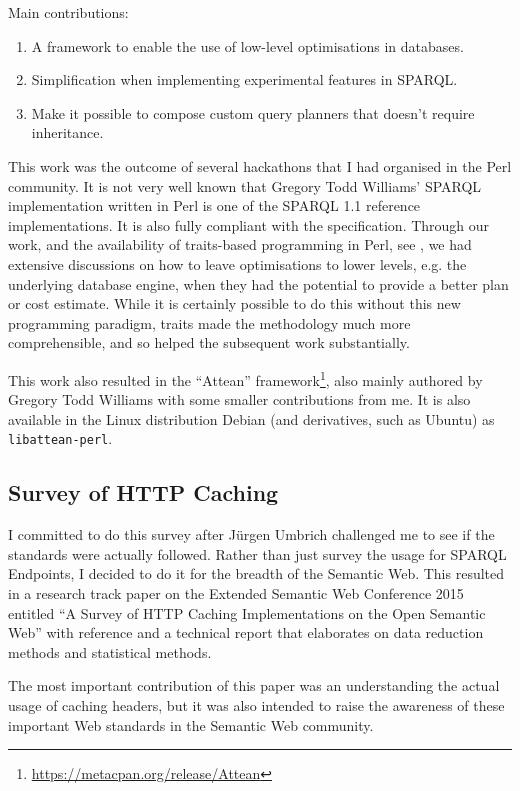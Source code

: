 Main contributions:
\begin{enumerate}
\item A framework to enable the use of low-level optimisations in
  databases.
\item Simplification when implementing experimental features in
  SPARQL.
\item Make it possible to compose custom query planners that doesn't
  require inheritance.
\end{enumerate}

This work was the outcome of several hackathons that I had organised
in the Perl community. It is not very well known that Gregory Todd
Williams' SPARQL implementation written in Perl is one of the SPARQL
1.1 reference implementations. It is also fully compliant with
the specification. Through our work, and the availability of
traits-based programming in Perl, see \cite{traits}, we had extensive
discussions on how to leave optimisations to lower levels, e.g. the
underlying database engine, when they had the potential to provide a
better plan or cost estimate. While it is certainly possible to do
this without this new programming paradigm, traits made the
methodology much more comprehensible, and so helped the subsequent
work substantially.

This work also resulted in the ``Attean''
framework\footnote{\url{https://metacpan.org/release/Attean}}, also
mainly authored by Gregory Todd Williams with some smaller
contributions from me. It is also available in the Linux distribution
Debian (and derivatives, such as Ubuntu) as \texttt{libattean-perl}.

\subsection{Survey of HTTP Caching}\label{sec:consanity}

I committed to do this survey after Jürgen Umbrich challenged me to see
if the standards were actually followed. Rather than just survey the
usage for SPARQL Endpoints, I decided to do it for the breadth of the
Semantic Web. This resulted in a research track paper on the Extended
Semantic Web Conference 2015 entitled ``A Survey of HTTP Caching
Implementations on the Open Semantic Web'' with reference
\cite{kjernsmo_survey_2015} and a technical report
\cite{kjernsmo_add_survey_2015} that elaborates on data reduction
methods and statistical methods.

The most important contribution of this paper was an understanding the
actual usage of caching headers, but it was also intended to raise the
awareness of these important Web standards in the Semantic Web community.

